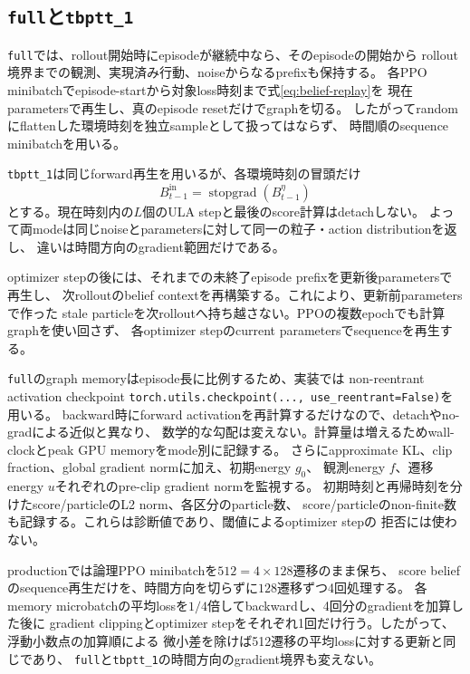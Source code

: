 \documentclass[a4paper,11pt]{article}
\newcommand{\stopgrad}{\operatorname{stopgrad}}
\begin{document}
\subsection{\texttt{full}と\texttt{tbptt\_1}}

\texttt{full}では、rollout開始時にepisodeが継続中なら、そのepisodeの開始から
rollout境界までの観測、実現済み行動、noiseからなるprefixも保持する。
各PPO minibatchでepisode-startから対象loss時刻まで式\eqref{eq:belief-replay}を
現在parametersで再生し、真のepisode resetだけでgraphを切る。
したがってrandomにflattenした環境時刻を独立sampleとして扱ってはならず、
時間順のsequence minibatchを用いる。

\texttt{tbptt\_1}は同じforward再生を用いるが、各環境時刻の冒頭だけ
\begin{equation}
  B^{\mathrm{in}}_{t-1}=\stopgrad(B^\eta_{t-1})
  \label{eq:tbptt-one}
\end{equation}
とする。現在時刻内の$L$個のULA stepと最後のscore計算はdetachしない。
よって両modeは同じnoiseとparametersに対して同一の粒子・action distributionを返し、
違いは時間方向のgradient範囲だけである。

optimizer stepの後には、それまでの未終了episode prefixを更新後parametersで再生し、
次rolloutのbelief contextを再構築する。これにより、更新前parametersで作った
stale particleを次rolloutへ持ち越さない。PPOの複数epochでも計算graphを使い回さず、
各optimizer stepのcurrent parametersでsequenceを再生する。

\texttt{full}のgraph memoryはepisode長に比例するため、実装では
non-reentrant activation checkpoint
\verb|torch.utils.checkpoint(..., use_reentrant=False)|を用いる。
backward時にforward activationを再計算するだけなので、detachやno-gradによる近似と異なり、
数学的な勾配は変えない。計算量は増えるためwall-clockとpeak GPU memoryをmode別に記録する。
さらにapproximate KL、clip fraction、global gradient normに加え、初期energy $g_0$、
観測energy $f$、遷移energy $u$それぞれのpre-clip gradient normを監視する。
初期時刻と再帰時刻を分けたscore/particleのL2 norm、各区分のparticle数、
score/particleのnon-finite数も記録する。これらは診断値であり、閾値によるoptimizer stepの
拒否には使わない。

productionでは論理PPO minibatchを$512=4\times128$遷移のまま保ち、
score beliefのsequence再生だけを、時間方向を切らずに$128$遷移ずつ4回処理する。
各memory microbatchの平均lossを$1/4$倍してbackwardし、4回分のgradientを加算した後に
gradient clippingとoptimizer stepをそれぞれ1回だけ行う。したがって、浮動小数点の加算順による
微小差を除けば512遷移の平均lossに対する更新と同じであり、
\texttt{full}と\texttt{tbptt\_1}の時間方向のgradient境界も変えない。
\end{document}
